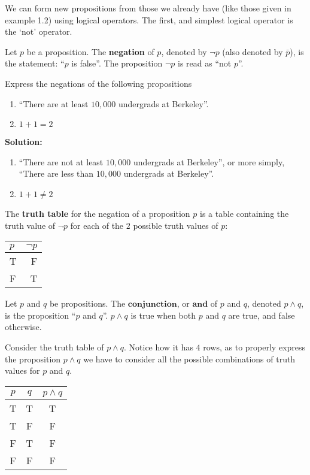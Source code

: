 We can form new propositions from those we already have (like those given
in example 1.2) using logical operators. The first, and simplest logical
operator is the `not' operator.

\begin{defn}
  Let $p$ be a proposition. The \textbf{negation} of $p$, denoted by
  $\neg p$ (also denoted by $\bar{p}$), is the statement: ``$p$ is
  false''. The proposition $\neg p$ is read as ``not $p$''.
\end{defn}

\example Express the negations of the following propositions
\begin{enumerate}[nosep]
\item ``There are at least $10,000$ undergrads at Berkeley''.
\item $1+1=2$
\end{enumerate}
\vspace{0cm}
\textbf{Solution:}
\begin{enumerate}[nosep]
\item ``There are not at least $10,000$ undergrads at Berkeley'', or more
  simply, ``There are less than $10,000$ undergrads at Berkeley''.
    \item $1+1\neq 2$
\end{enumerate}

The \textbf{truth table} for the negation of a proposition $p$ is a table
containing the truth value of $\neg p$ for each of the $2$ possible truth
values of $p$:
\begin{table}[h] \centering
  \begin{tabular}{l|r}
    $p$ & $\neg p$ \\\hline
    T & F \\
    F & T
  \end{tabular}
\end{table}

\begin{defn}
  Let $p$ and $q$ be propositions. The $\textbf{conjunction}$, or
  $\textbf{and}$ of $p$ and $q$, denoted $p\wedge q$, is the proposition
  ``$p$ and $q$''. $p\wedge q$ is true when both $p$ and $q$ are true, and
  false otherwise.
\end{defn}

Consider the truth table of $p\wedge q$. Notice how it has $4$ rows, as to
properly express the proposition $p\wedge q$ we have to consider all the
possible combinations of truth values for $p$ and $q$.
\begin{table}[h] \centering
  \begin{tabular}{cc|c}
    $p$ & $q$ & $p\wedge q$ \\\hline
    T & T & T \\
    T & F & F \\
    F & T & F \\
    F & F & F
  \end{tabular}
\end{table}

